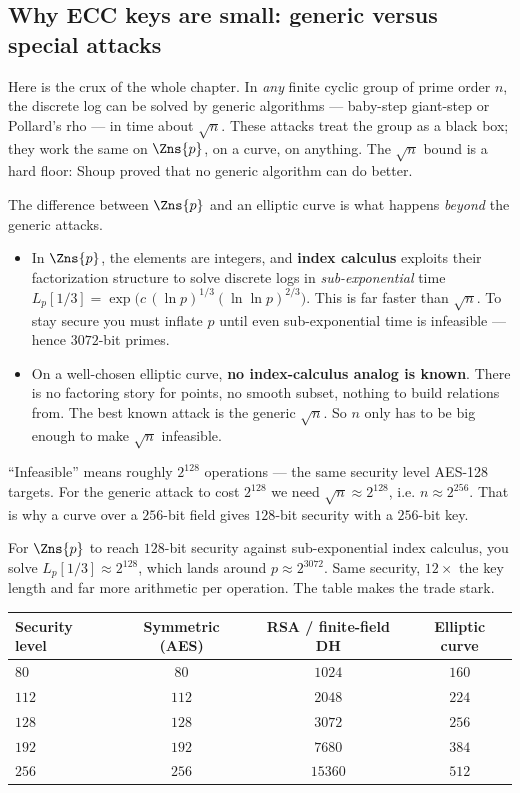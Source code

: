 \subsection{Why ECC keys are small: generic versus special attacks}
\label{ch21:keysize}

Here is the crux of the whole chapter. In \emph{any} finite cyclic group of prime order
$n$, the discrete log can be solved by generic algorithms --- baby-step giant-step or
Pollard's rho --- in time about $\sqrt{n}$. These attacks treat the group as a black box;
they work the same on $\Zns{p}$, on a curve, on anything. The $\sqrt{n}$ bound is a hard
floor: Shoup proved that no generic algorithm can do better.

The difference between $\Zns{p}$ and an elliptic curve is what happens \emph{beyond} the
generic attacks.

\begin{itemize}
  \item In $\Zns{p}$, the elements are integers, and \textbf{index calculus} exploits
        their factorization structure to solve discrete logs in \emph{sub-exponential}
        time $L_p[1/3] = \exp\!\big(c\,(\ln p)^{1/3}(\ln\ln p)^{2/3}\big)$. This is far
        faster than $\sqrt n$. To stay secure you must inflate $p$ until even
        sub-exponential time is infeasible --- hence $3072$-bit primes.
  \item On a well-chosen elliptic curve, \textbf{no index-calculus analog is known}.
        There is no factoring story for points, no smooth subset, nothing to build
        relations from. The best known attack is the generic $\sqrt n$. So $n$ only has
        to be big enough to make $\sqrt n$ infeasible.
\end{itemize}

\begin{whybox}
``Infeasible'' means roughly $2^{128}$ operations --- the same security level AES-128
targets. For the generic attack to cost $2^{128}$ we need $\sqrt n \approx 2^{128}$,
i.e. $n \approx 2^{256}$. That is why a curve over a $256$-bit field gives $128$-bit
security with a $256$-bit key.

For $\Zns{p}$ to reach $128$-bit security against sub-exponential index calculus, you
solve $L_p[1/3] \approx 2^{128}$, which lands around $p \approx 2^{3072}$. Same security,
$12\times$ the key length and far more arithmetic per operation. The table makes the
trade stark.
\end{whybox}

\begin{center}
\begin{tabular}{lccc}
\toprule
Security level & Symmetric (AES) & RSA / finite-field DH & Elliptic curve \\
\midrule
$80$  & $80$  & $1024$ & $160$ \\
$112$ & $112$ & $2048$ & $224$ \\
$128$ & $128$ & $3072$ & $256$ \\
$192$ & $192$ & $7680$ & $384$ \\
$256$ & $256$ & $15360$ & $512$ \\
\bottomrule
\end{tabular}
\end{center}

